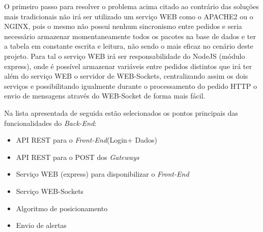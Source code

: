 \par O primeiro passo para resolver o problema acima citado ao contrário das soluções mais tradicionais não irá ser utilizado um serviço WEB como o APACHE2 ou o NGINX, pois o mesmo não possui nenhum sincronismo entre pedidos e seria necessário armazenar momentaneamente todos os pacotes na base de dados e ter a tabela em constante escrita e leitura, não sendo o mais eficaz no cenário deste projeto. Para tal o serviço WEB irá ser responsabilidade do NodeJS (módulo express), onde é possível armazenar variáveis entre pedidos distintos que irá ter além do serviço WEB o servidor de WEB-Sockets, centralizando assim os dois serviços e possibilitando igualmente durante o processamento do pedido HTTP o envio de mensagens através do WEB-Socket de forma mais fácil. 
\par Na lista apresentada de seguida estão selecionados os pontos principais das funcionalidades do \textit{Back-End}:

\par
\begin{itemize}
\item API REST para o \textit{Front-End}(Login+ Dados)
\item API REST para o POST dos \textit{Gateways}
\item Serviço WEB (express) para disponibilizar o \textit{Front-End}
\item Serviço WEB-Sockets 
\item Algoritmo de posicionamento
\item Envio de alertas
\end{itemize}
\par

